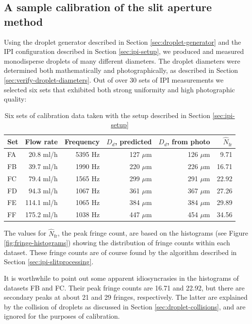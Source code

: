 \documentclass[10pt]{book}
\begin{document}
\subsection{A sample calibration of the slit aperture method}
Using the droplet generator described in Section \ref{sec:droplet-generator} and
the IPI configuration described in Section \ref{sec:ipi-setup}, we produced and
measured monodisperse droplets of many different diameters. The droplet
diameters were determined both mathematically and photographically, as described
in Section \ref{sec:verify-droplet-diameters}. Out of over 30 sets of IPI
measurements we selected six sets that exhibited both strong uniformity and
high photographic quality:

\begin{table}[h]
    \centering
    \begin{tabular}{lrrrrr}
    \toprule
    Set & Flow rate & Frequency & $D_d$, predicted  & $D_d$, from
photo & $\hat{N}_\text{fr}$ \\
    \midrule
    FA & 20.8  ml/h  & 5395 Hz  & 127 $\mu$m  & 126 $\mu$m &  9.71      \\
    FB & 39.7  ml/h  & 1990 Hz  & 220 $\mu$m  & 226 $\mu$m &  16.71     \\
    FC & 79.4  ml/h  & 1565 Hz  & 299 $\mu$m  & 291 $\mu$m &  22.92     \\
    FD & 94.3  ml/h  & 1067 Hz  & 361 $\mu$m  & 367 $\mu$m &  27.26     \\
    FE & 114.1 ml/h  & 1065 Hz  & 384 $\mu$m  & 384 $\mu$m &  29.89     \\
    FF & 175.2 ml/h  & 1038 Hz  & 447 $\mu$m  & 454 $\mu$m &  34.56     \\
    \bottomrule
\end{tabular}
\caption{Six sets of calibration data taken with the setup described in Section
\ref{sec:ipi-setup}}
\label{tab:ipi-calibration-datasets}
\end{table}
The values for $\hat{N}_\text{fr}$, the peak fringe count, are based on the
histograms (see Figure \ref{fig:fringe-histograms}) showing the distribution of
fringe counts within each dataset. These fringe counts are of course found by
the algorithm described in Section \ref{sec:ipi-slitprocessing}.

It is worthwhile to point out some apparent idiosyncrasies in the histograms of
datasets FB and FC. Their peak fringe counts are 16.71 and 22.92, but there
are secondary peaks at about 21 and 29 fringes, respectively. The latter are
explained by the collision of droplets as discussed in Section
\ref{sec:droplet-collisions}, and are ignored for the purposes of calibration.
\end{document}
